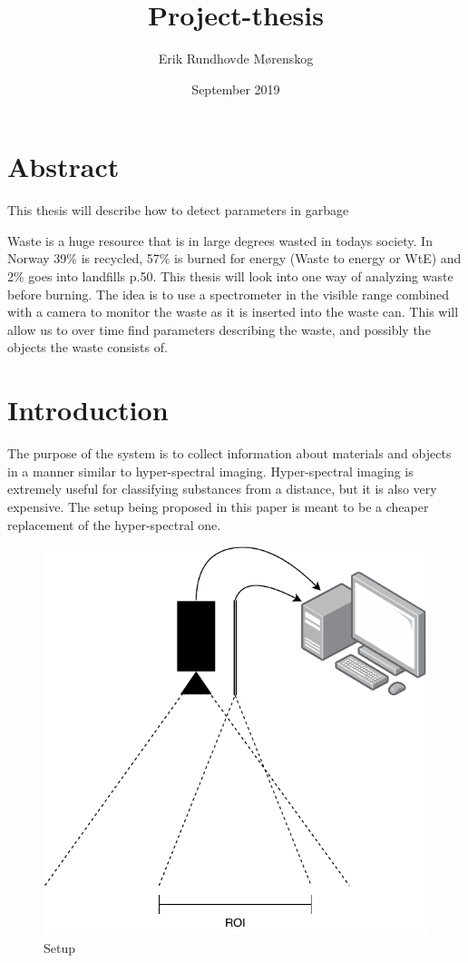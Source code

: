 \documentclass{article}
\title{Project-thesis}
\author{Erik Rundhovde M\o renskog}
\date{September 2019}
\begin{document}
\maketitle

\section{Abstract}
This thesis will describe how to detect parameters in garbage 

Waste is a huge resource that is in large degrees wasted in todays society. In Norway 39\% is recycled, 57\% is burned for energy (Waste to energy or WtE) and 2\% goes into landfills \cite{EnvironmentGlance20152015} p.50. This thesis will look into one way of analyzing waste before burning. The idea is to use a spectrometer in the visible range combined with a camera to monitor the waste as it is inserted into the waste can. This will allow us to over time find parameters describing the waste, and possibly the objects the waste consists of. 


\section{Introduction}
The purpose of the system is to collect information about materials and objects in a manner similar to hyper-spectral imaging. Hyper-spectral imaging is extremely useful for classifying substances from a distance, but it is also very expensive. The setup being proposed in this paper is meant to be a cheaper replacement of the hyper-spectral one. 


\begin{figure}[]
    \centering
    \includegraphics[]{figures/pt_setup.pdf}
    \caption{Setup}
    \label{}
\end{figure}
\end{document}
